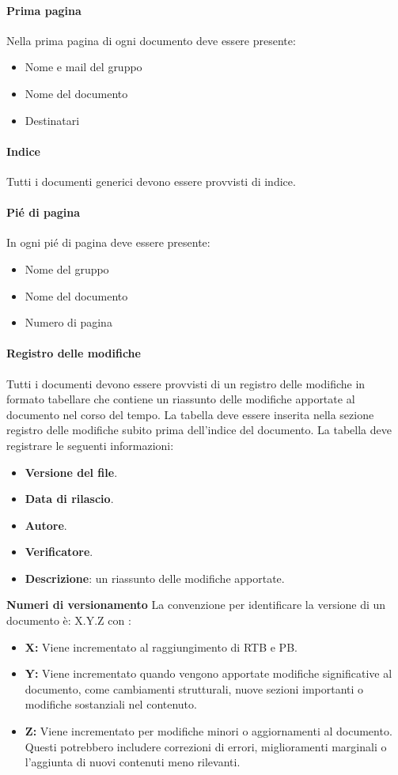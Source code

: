 \documentclass{article}
\begin{document}
\paragraph*{Prima pagina}
Nella prima pagina di ogni documento deve essere presente:
\begin{itemize}
    \item Nome e mail del gruppo
    \item Nome del documento 
    \item Destinatari
\end{itemize}
\paragraph*{Indice}
Tutti i documenti generici devono essere provvisti di indice.
\paragraph*{Pié di pagina}
In ogni pié di pagina deve essere presente:
\begin{itemize}
    \item Nome del gruppo
    \item Nome del documento 
    \item Numero di pagina
\end{itemize}
\paragraph*{Registro delle modifiche}\label{sec:RegistroModifiche}
Tutti i documenti devono essere provvisti di un registro delle modifiche in formato tabellare che contiene un riassunto
delle modifiche apportate al documento nel corso del tempo.
La tabella  deve essere inserita nella
sezione registro delle modifiche subito prima dell’indice del documento.
La tabella deve registrare le seguenti informazioni:
\begin{itemize}
\item \textbf{Versione del file}.
\item \textbf{Data di rilascio}.
\item \textbf{Autore}.
\item \textbf{Verificatore}.
\item \textbf{Descrizione}: un riassunto delle modifiche apportate.
\end{itemize}
\textbf{Numeri di versionamento}
 La convenzione per identificare la versione di un documento è: X.Y.Z
con :
\begin{itemize}
\item \textbf{X: }Viene incrementato al raggiungimento di RTB e PB.
 \item \textbf{Y: }Viene incrementato quando vengono apportate modifiche significative al documento, come cambiamenti strutturali, nuove sezioni importanti o modifiche sostanziali nel contenuto.
 \item \textbf{Z: }Viene incrementato per modifiche minori o aggiornamenti al documento. Questi potrebbero includere correzioni di errori, miglioramenti marginali o l'aggiunta di nuovi contenuti meno rilevanti.
\end{itemize}
\end{document}
